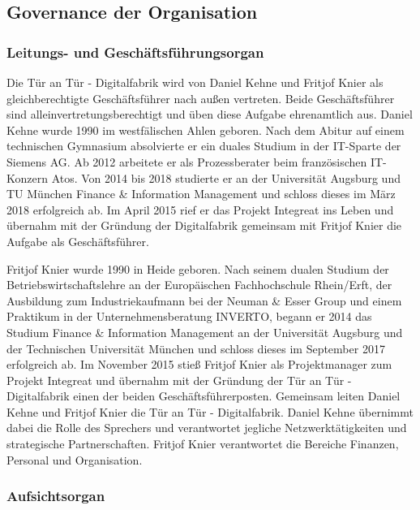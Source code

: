 \documentclass[12pt, a4paper]{article} %
\begin{document}
\hypertarget{governance-der-organisation}{%
\subsection{Governance der
Organisation}\label{governance-der-organisation}}

\hypertarget{leitungs--und-geschuxe4ftsfuxfchrungsorgan}{%
\subsubsection{Leitungs- und
Geschäftsführungsorgan}\label{leitungs--und-geschuxe4ftsfuxfchrungsorgan}}

Die Tür an Tür - Digitalfabrik wird von Daniel Kehne und Fritjof Knier
als gleichberechtigte Geschäftsführer nach außen vertreten. Beide
Geschäftsführer sind alleinvertretungsberechtigt und üben diese Aufgabe
ehrenamtlich aus. Daniel Kehne wurde 1990 im westfälischen Ahlen
geboren. Nach dem Abitur auf einem technischen Gymnasium absolvierte er
ein duales Studium in der IT-Sparte der Siemens AG. Ab 2012 arbeitete er
als Prozessberater beim französischen IT-Konzern Atos. Von 2014 bis 2018
studierte er an der Universität Augsburg und TU München Finance \&
Information Management und schloss dieses im März 2018 erfolgreich ab.
Im April 2015 rief er das Projekt Integreat ins Leben und übernahm mit
der Gründung der Digitalfabrik gemeinsam mit Fritjof Knier die Aufgabe
als Geschäftsführer.

Fritjof Knier wurde 1990 in Heide geboren. Nach seinem dualen Studium
der Betriebswirtschaftslehre an der Europäischen Fachhochschule
Rhein/Erft, der Ausbildung zum Industriekaufmann bei der Neuman \& Esser
Group und einem Praktikum in der Unternehmensberatung INVERTO, begann er
2014 das Studium Finance \& Information Management an der Universität
Augsburg und der Technischen Universität München und schloss dieses im
September 2017 erfolgreich ab. Im November 2015 stieß Fritjof Knier als
Projektmanager zum Projekt Integreat und übernahm mit der Gründung der
Tür an Tür - Digitalfabrik einen der beiden Geschäftsführerposten.
Gemeinsam leiten Daniel Kehne und Fritjof Knier die Tür an Tür -
Digitalfabrik. Daniel Kehne übernimmt dabei die Rolle des Sprechers und
verantwortet jegliche Netzwerktätigkeiten und strategische
Partnerschaften. Fritjof Knier verantwortet die Bereiche Finanzen,
Personal und Organisation.

\hypertarget{aufsichtsorgan}{%
\subsubsection{Aufsichtsorgan}\label{aufsichtsorgan}}
\end{document}
